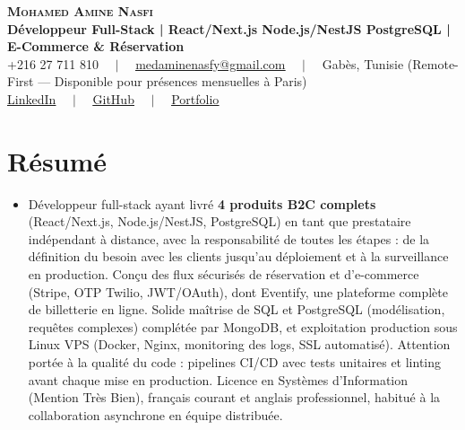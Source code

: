 \documentclass[letterpaper,9pt]{article}
\begin{document}
\begin{center}
    \textbf{\Huge \scshape \color{navy} Mohamed Amine Nasfi} \\[3pt]
    \small \textbf{\color{accent} Développeur Full-Stack | React/Next.js \textperiodcentered{} Node.js/NestJS \textperiodcentered{} PostgreSQL | E-Commerce \& Réservation} \\[3pt]
    \footnotesize \color{greytext}
    +216 27 711 810 $\quad|\quad$
    \href{mailto:medaminenasfy@gmail.com}{\underline{medaminenasfy@gmail.com}} $\quad|\quad$
    Gabès, Tunisie (Remote-First — Disponible pour présences mensuelles à Paris) \\[2pt]
    \href{https://www.linkedin.com/in/mohamed-amine-nasfi/}{\underline{LinkedIn}} $\quad|\quad$ \href{https://github.com/medaminenasfi}{\underline{GitHub}} $\quad|\quad$ \href{https://mohamedamine-portfolio.onrender.com}{\underline{Portfolio}}
\end{center}
\vspace{-5pt}

\section{Résumé}
\begin{itemize}[leftmargin=0.18in, label={}, itemsep=1.2pt, topsep=1.5pt, parsep=0pt]
\item \footnotesize{Développeur full-stack ayant livré \textbf{4 produits B2C complets} (React/Next.js, Node.js/NestJS, PostgreSQL) en tant que prestataire indépendant à distance, avec la responsabilité de toutes les étapes : de la définition du besoin avec les clients jusqu'au déploiement et à la surveillance en production. Conçu des flux sécurisés de réservation et d'e-commerce (Stripe, OTP Twilio, JWT/OAuth), dont Eventify, une plateforme complète de billetterie en ligne. Solide maîtrise de SQL et PostgreSQL (modélisation, requêtes complexes) complétée par MongoDB, et exploitation production sous Linux VPS (Docker, Nginx, monitoring des logs, SSL automatisé). Attention portée à la qualité du code : pipelines CI/CD avec tests unitaires et linting avant chaque mise en production. Licence en Systèmes d'Information (Mention Très Bien), français courant et anglais professionnel, habitué à la collaboration asynchrone en équipe distribuée.}
\end{itemize}\vspace{-3pt}

\end{document}

